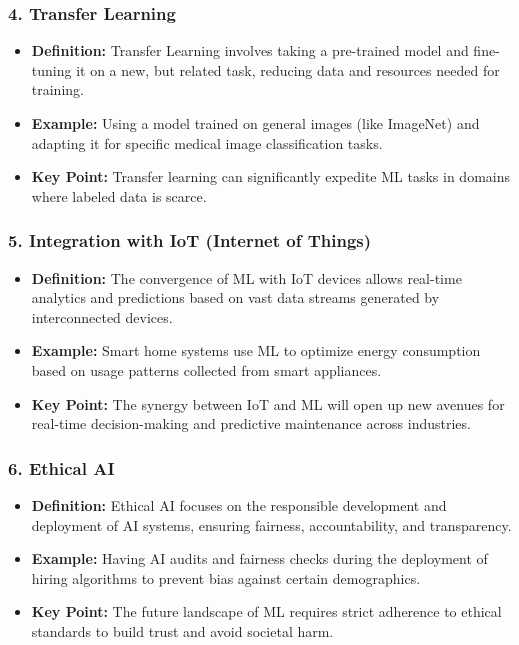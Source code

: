 \documentclass[aspectratio=169]{beamer}
\begin{document}
\begin{frame}[fragile]
    \frametitle{4. Transfer Learning}
    \begin{itemize}
        \item \textbf{Definition:} Transfer Learning involves taking a pre-trained model and fine-tuning it on a new, but related task, reducing data and resources needed for training.
        
        \item \textbf{Example:} Using a model trained on general images (like ImageNet) and adapting it for specific medical image classification tasks.
        
        \item \textbf{Key Point:} Transfer learning can significantly expedite ML tasks in domains where labeled data is scarce.
    \end{itemize}
\end{frame}

\begin{frame}[fragile]
    \frametitle{5. Integration with IoT (Internet of Things)}
    \begin{itemize}
        \item \textbf{Definition:} The convergence of ML with IoT devices allows real-time analytics and predictions based on vast data streams generated by interconnected devices.
        
        \item \textbf{Example:} Smart home systems use ML to optimize energy consumption based on usage patterns collected from smart appliances.
        
        \item \textbf{Key Point:} The synergy between IoT and ML will open up new avenues for real-time decision-making and predictive maintenance across industries.
    \end{itemize}
\end{frame}

\begin{frame}[fragile]
    \frametitle{6. Ethical AI}
    \begin{itemize}
        \item \textbf{Definition:} Ethical AI focuses on the responsible development and deployment of AI systems, ensuring fairness, accountability, and transparency.
        
        \item \textbf{Example:} Having AI audits and fairness checks during the deployment of hiring algorithms to prevent bias against certain demographics.
        
        \item \textbf{Key Point:} The future landscape of ML requires strict adherence to ethical standards to build trust and avoid societal harm.
    \end{itemize}
\end{frame}
\end{document}
